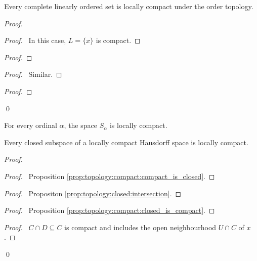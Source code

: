  \begin{prop}
Every complete linearly ordered set is locally compact under the order
topology.
\end{prop}

\begin{proof}
\pf
{}
\begin{proof}
\pf\ In this case, $L = \{ x \}$ is compact.
\end{proof}
\begin{proof}
\step{<2>2}{Take $C = [a,x]$ and $U = (a, x]$}
\end{proof}
\begin{proof}
  \pf\ Similar.
\end{proof}
\begin{proof}
\end{proof}
\qed
\end{proof}

\begin{cor}
For every ordinal $\alpha$, the space $S_\alpha$ is locally compact.
\end{cor}


\begin{thm}
  \label{thm:topology:locally_compact:closed_subspace}
  Every closed subspace of a locally compact Hausdorff space is locally
  compact.
\end{thm}

\begin{proof}
  \pf
  \begin{proof}
    \pf\ Proposition \ref{prop:topology:compact:compact_is_closed}.
  \end{proof}
  \begin{proof}
    \pf\ Propositon \ref{prop:topology:closed:intersection}.
  \end{proof}
  \begin{proof}
    \pf\ Proposition \ref{prop:topology:compact:closed_is_compact}.
  \end{proof}
  \qedstep
  \begin{proof}
    \pf\ $C \cap D \subseteq C$ is compact and includes the open
    neighbourhood
    $U \cap C$ of $x$.
  \end{proof}
  \qed
\end{proof}


